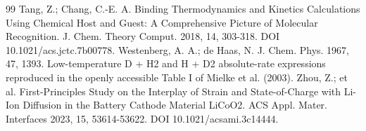 \begin{thebibliography}{99}
 Tang, Z.; Chang, C.-E. A. Binding Thermodynamics and Kinetics Calculations Using Chemical Host and Guest: A Comprehensive Picture of Molecular Recognition. J. Chem. Theory Comput. 2018, 14, 303-318. DOI 10.1021/acs.jctc.7b00778.
 Westenberg, A. A.; de Haas, N. J. Chem. Phys. 1967, 47, 1393. Low-temperature D + H2 and H + D2 absolute-rate expressions reproduced in the openly accessible Table I of Mielke et al. (2003).
 Zhou, Z.; et al. First-Principles Study on the Interplay of Strain and State-of-Charge with Li-Ion Diffusion in the Battery Cathode Material LiCoO2. ACS Appl. Mater. Interfaces 2023, 15, 53614-53622. DOI 10.1021/acsami.3c14444.
\end{thebibliography}
